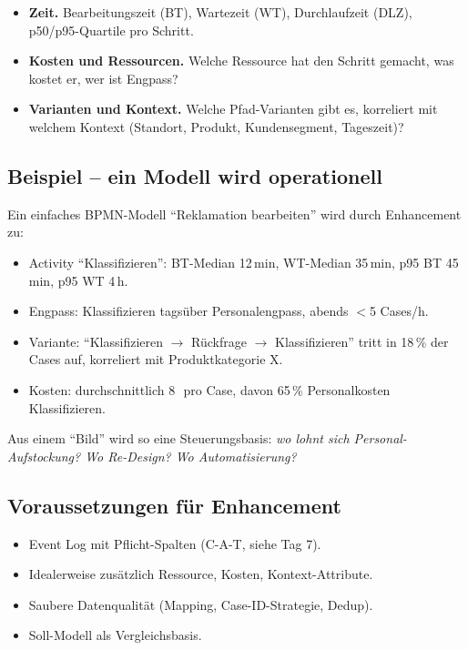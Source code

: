 \documentclass[11pt,a4paper,oneside]{article}
\newcommand{\fachbegriff}[1]{\textbf{#1}}
\begin{document}
\begin{itemize}
  \item \fachbegriff{Zeit.} Bearbeitungszeit (BT), Wartezeit (WT), Durchlaufzeit (DLZ), p50/p95-Quartile pro Schritt.
  \item \fachbegriff{Kosten und Ressourcen.} Welche Ressource hat den Schritt gemacht, was kostet er, wer ist Engpass?
  \item \fachbegriff{Varianten und Kontext.} Welche Pfad-Varianten gibt es, korreliert mit welchem Kontext (Standort, Produkt, Kunden\-segment, Tageszeit)?
\end{itemize}

\subsection{Beispiel -- ein Modell wird operationell}

Ein einfaches BPMN-Modell ``Reklamation bearbeiten'' wird durch Enhancement zu:

\begin{itemize}
  \item Activity ``Klassifizieren'': BT-Median 12\,min, WT-Median 35\,min, p95 BT 45\,min, p95 WT 4\,h.
  \item Engpass: Klassifizieren tagsüber Personalengpass, abends $<$5 Cases/h.
  \item Variante: ``Klassifizieren $\rightarrow$ Rückfrage $\rightarrow$ Klassifizieren'' tritt in 18\,\% der Cases auf, korreliert mit Produktkategorie X.
  \item Kosten: durchschnittlich 8\,\text{\euro}\ pro Case, davon 65\,\% Personalkosten Klassifizieren.
\end{itemize}

Aus einem ``Bild'' wird so eine Steuerungsbasis: \emph{wo lohnt sich Personal-Aufstockung? Wo Re-Design? Wo Automatisierung?}

\subsection{Voraussetzungen für Enhancement}

\begin{itemize}
  \item Event Log mit Pflicht-Spalten (C-A-T, siehe Tag 7).
  \item Idealerweise zusätzlich Ressource, Kosten, Kontext-Attribute.
  \item Saubere Datenqualität (Mapping, Case-ID-Strategie, Dedup).
  \item Soll-Modell als Vergleichsbasis.
\end{itemize}
\end{document}
